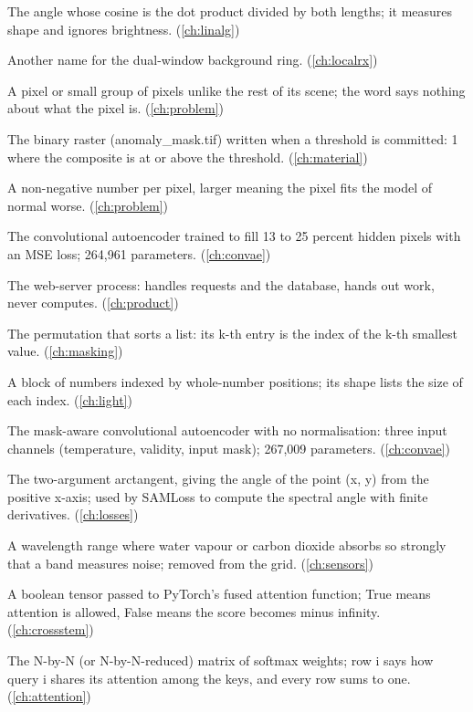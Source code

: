 \begin{description}[style=nextline,leftmargin=1.2em,font=\normalfont\bfseries]
\item[Angle between vectors] The angle whose cosine is the dot product divided by both lengths; it measures shape and ignores brightness. (\cref{ch:linalg})
\item[Annulus] Another name for the dual-window background ring. (\cref{ch:localrx})
\item[Anomaly] A pixel or small group of pixels unlike the rest of its scene; the word says nothing about what the pixel is. (\cref{ch:problem})
\item[Anomaly mask] The binary raster (anomaly\_mask.tif) written when a threshold is committed: 1 where the composite is at or above the threshold. (\cref{ch:material})
\item[Anomaly score] A non-negative number per pixel, larger meaning the pixel fits the model of normal worse. (\cref{ch:problem})
\item[Antardhana] The convolutional autoencoder trained to fill 13 to 25 percent hidden pixels with an MSE loss; 264,961 parameters. (\cref{ch:convae})
\item[api] The web-server process: handles requests and the database, hands out work, never computes. (\cref{ch:product})
\item[Argsort] The permutation that sorts a list: its k-th entry is the index of the k-th smallest value. (\cref{ch:masking})
\item[Array] A block of numbers indexed by whole-number positions; its shape lists the size of each index. (\cref{ch:light})
\item[Asanskrita] The mask-aware convolutional autoencoder with no normalisation: three input channels (temperature, validity, input mask); 267,009 parameters. (\cref{ch:convae})
\item[atan2] The two-argument arctangent, giving the angle of the point (x, y) from the positive x-axis; used by SAMLoss to compute the spectral angle with finite derivatives. (\cref{ch:losses})
\item[Atmospheric window (absorption)] A wavelength range where water vapour or carbon dioxide absorbs so strongly that a band measures noise; removed from the grid. (\cref{ch:sensors})
\item[Attention mask] A boolean tensor passed to PyTorch's fused attention function; True means attention is allowed, False means the score becomes minus infinity. (\cref{ch:crossstem})
\item[Attention matrix] The N-by-N (or N-by-N-reduced) matrix of softmax weights; row i says how query i shares its attention among the keys, and every row sums to one. (\cref{ch:attention})

\end{description}
